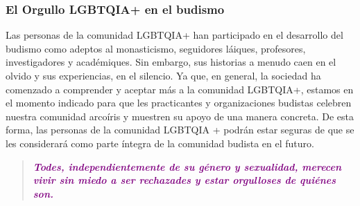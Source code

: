 \documentclass[12pt,openany]{book}
\begin{document}
\subsubsection*{El Orgullo LGBTQIA+ en el budismo}

Las personas de la comunidad LGBTQIA+ han participado en el desarrollo del budismo como adeptos al monasticismo, seguidores láiques, profesores, investigadores y académiques. Sin embargo, sus historias a menudo caen en el olvido y sus experiencias, en el silencio. Ya que, en general, la sociedad ha comenzado a comprender y aceptar más a la comunidad LGBTQIA+, estamos en el momento indicado para que les practicantes y organizaciones budistas  celebren nuestra comunidad arcoíris y muestren su apoyo de una manera concreta. De esta forma, las personas de la comunidad LGBTQIA + podrán estar seguras de que se les considerará como parte íntegra de la comunidad budista en el futuro.

\begin{figure}[h]
    \centering
\end{figure}

\begin{quote}
\centering
\doublespacing
\textit{\Large \textcolor{purple}{\textbf{Todes, independientemente de su género y sexualidad, merecen vivir sin miedo a ser rechazades y estar orgulloses de quiénes son.}}}
\end{quote}
\end{document}
